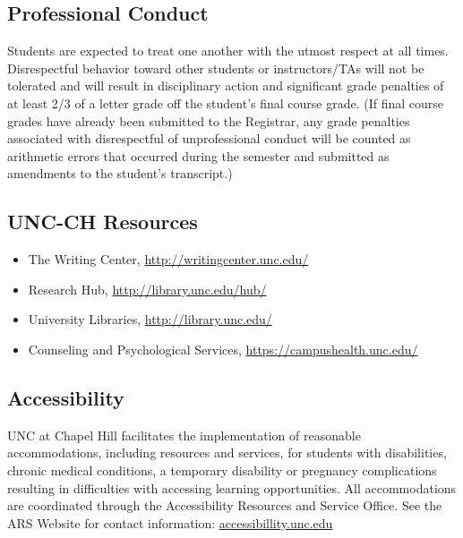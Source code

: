 \documentclass[11pt,]{article}
\providecommand{\tightlist}{%
  \setlength{\itemsep}{0pt}\setlength{\parskip}{0pt}}
\begin{document}
\hypertarget{professional-conduct}{%
\subsection{Professional Conduct}\label{professional-conduct}}

Students are expected to treat one another with the utmost respect at
all times. Disrespectful behavior toward other students or
instructors/TAs will not be tolerated and will result in disciplinary
action and significant grade penalties of at least 2/3 of a letter grade
off the student's final course grade. (If final course grades have
already been submitted to the Registrar, any grade penalties associated
with disrespectful of unprofessional conduct will be counted as
arithmetic errors that occurred during the semester and submitted as
amendments to the student's transcript.)

\hypertarget{unc-ch-resources}{%
\subsection{UNC-CH Resources}\label{unc-ch-resources}}

\begin{itemize}
\tightlist
\item
  The Writing Center, \url{http://writingcenter.unc.edu/}
\item
  Research Hub, \url{http://library.unc.edu/hub/}
\item
  University Libraries, \url{http://library.unc.edu/}
\item
  Counseling and Psychological Services,
  \url{https://campushealth.unc.edu/}
\end{itemize}

\hypertarget{accessibility}{%
\subsection{Accessibility}\label{accessibility}}

UNC at Chapel Hill facilitates the implementation of reasonable
accommodations, including resources and services, for students with
disabilities, chronic medical conditions, a temporary disability or
pregnancy complications resulting in difficulties with accessing
learning opportunities. All accommodations are coordinated through the
Accessibility Resources and Service Office. See the ARS Website for
contact information: \url{accessibillity.unc.edu}
\end{document}
